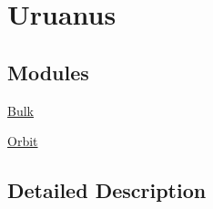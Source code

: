 \hypertarget{group___e_g_x_phys-_constants-_astrophysics-_solar_system-_uruanus}{}\section{Uruanus}
\label{group___e_g_x_phys-_constants-_astrophysics-_solar_system-_uruanus}
\subsection*{Modules}
\begin{DoxyCompactItemize}
\item 
\mbox{\hyperlink{group___e_g_x_phys-_constants-_astrophysics-_solar_system-_uruanus-_bulk}{Bulk}}
\item 
\mbox{\hyperlink{group___e_g_x_phys-_constants-_astrophysics-_solar_system-_uruanus-_orbit}{Orbit}}
\end{DoxyCompactItemize}


\subsection{Detailed Description}
